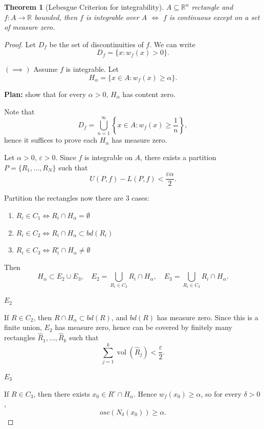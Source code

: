 \documentclass[11pt,openany]{book}
\theoremstyle{plain}
\newtheorem{theorem}{Theorem}[chapter]
\theoremstyle{definition}
\theoremstyle{remark}
\newcommand{\R}{\mathbb{R}}
\newcommand{\vol}{\operatorname{vol}}
\begin{document}
\begin{theorem}[Lebesgue Criterion for integrability]
    $A \subseteq \R^n$ rectangle and $f \colon A \to \R$ bounded, then $f$ is integrable over $A$ 
    $\iff$ $f$ is continuous except on a set of measure zero. 
\end{theorem}
\begin{proof}
    Let $D_f$ be the set of discontinuities of $f$. We can write
    \[
    D_f = \{x : w_f(x) > 0\}.
    \]

    $(\implies)$ Assume $f$ is integrable. Let 
    \[
    H_\alpha = \{ x \in A : w_f(x) \ge \alpha\}.
    \]

    \textbf{Plan:} show that for every $\alpha > 0$, $H_\alpha$ has content zero.

    Note that
    \[
    D_f = \bigcup_{n=1}^{\infty} \left\{ x \in A : w_f(x) \ge \frac{1}{n} \right\},
    \]
    hence it suffices to prove each $H_\alpha$ has measure zero.

    Let $\alpha > 0$, $\varepsilon > 0$. Since $f$ is integrable on $A$, there exists a partition $P = \{R_1,\dots,R_N\}$ such that
    \[
    U(P,f) - L(P,f) < \frac{\varepsilon \alpha}{2}.
    \]

    Partition the rectangles now there are 3 cases:
    \begin{enumerate}
        \item $R_i \in C_1 \iff R_i \cap H_\alpha = \emptyset$
        \item $R_i \in C_2 \iff R_i \cap H_\alpha \subset bd(R_i)$
        \item $R_i \in C_3 \iff R_i^\circ \cap H_\alpha \ne \emptyset$
    \end{enumerate}

    Then
    \[
    H_\alpha \subset E_2 \cup E_3,
    \quad
    E_2 = \bigcup_{R_i \in C_2} R_i \cap H_\alpha,
    \quad
    E_3 = \bigcup_{R_i \in C_3} R_i \cap H_\alpha.
    \]

    \textbf{$E_2$}

    If $R \in C_2$, then $R \cap H_\alpha \subset bd(R)$, and $bd(R)$ has measure zero. Since this is a finite union, $E_2$ has measure zero, hence can be covered by finitely many rectangles $\widehat{R}_1,\dots,\widehat{R}_k$ such that
    \[
    \sum_{j=1}^k \vol(\widehat{R}_j) < \frac{\varepsilon}{2}.
    \]

    \textbf{$E_3$}

    If $R \in C_3$, then there exists $x_0 \in R^\circ \cap H_\alpha$. Hence $w_f(x_0) \ge \alpha$, so for every $\delta > 0$,
    \[
    osc(N_\delta(x_0)) \ge \alpha.
    \]


\end{proof}
\end{document}
